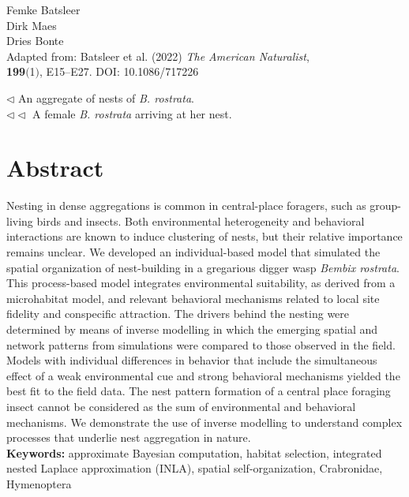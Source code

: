 \documentclass[10pt, twoside]{book} %
\begin{document}
	\begin{flushright} \color{gray} Femke Batsleer\\ Dirk Maes\\ Dries Bonte\\


	\vspace*{2cm}
	Adapted from: Batsleer et al. (2022) \textit{The American Naturalist},\\ \textbf{199}$($1$)$, E15--E27. DOI: 10.1086/717226
	\end{flushright}
\vspace*{\fill}
\noindent \color{gray} $\lhd$ An aggregate of nests of \textit{B. rostrata}.\\
\noindent $\lhd\lhd$ A female \textit{B. rostrata} arriving at her nest.

\color{black}
\newpage
	
	
		\section{Abstract}
		Nesting in dense aggregations is common in central-place foragers, such as group-living birds and insects. Both environmental heterogeneity and behavioral interactions are known to induce clustering of nests, but their relative importance remains unclear. We developed an individual-based model that simulated the spatial organization of nest-building in a gregarious digger wasp \textit{Bembix rostrata}. This process-based model integrates environmental suitability, as derived from a microhabitat model, and relevant behavioral mechanisms related to local site fidelity and conspecific attraction. The drivers behind the nesting were determined by means of inverse modelling in which the emerging spatial and network patterns from simulations were compared to those observed in the field. Models with individual differences in behavior that include the simultaneous effect of a weak environmental cue and strong behavioral mechanisms yielded the best fit to the field data. The nest pattern formation of a central place foraging insect cannot be considered as the sum of environmental and behavioral mechanisms. We demonstrate the use of inverse modelling to understand complex processes that underlie nest aggregation in nature.\\
		
		\vspace*{\fill}
		\noindent \textbf{Keywords:} approximate Bayesian computation, habitat selection, integrated nested Laplace approximation (INLA), spatial self-organization, Crabronidae, Hymenoptera
		
\end{document}
